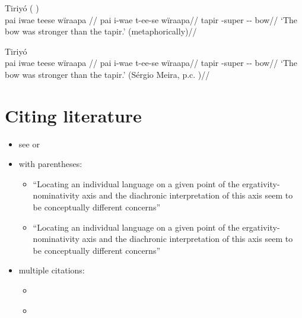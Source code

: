 \documentclass{memoir}
\begin{document}
\ex  Tiriyó (\cite[420]{triomeira1999}
) \\\label{tri-1}
\begingl \glpreamble pai iwae teese wïraapa //
\gla pai i-wae t-ee-se wïraapa//
\glb tapir -super -- bow//
\glft ‘The bow was stronger than the tapir.’ (metaphorically)//
\endgl
\xe

\ex  Tiriyó  \\\label{tri-1}
\begingl \glpreamble pai iwae teese wïraapa //
\gla pai i-wae t-ee-se wïraapa//
\glb tapir -super -- bow//
\glft ‘The bow was stronger than the tapir.’ (Sérgio Meira, p.c.
)//
\endgl
\xe

\chapter{\texorpdfstring{Citing literature
\label{sec:sources}}{Citing literature }}

\begin{itemize}
\tightlist
\item
  see \textcites{alvarez1998split} or
  \textcites[133-134]{alvarez1998split}
\item
  with parentheses:

  \begin{itemize}
  \tightlist
  \item
    ``Locating an individual language on a given point of the
    ergativity-nominativity axis and the diachronic interpretation of
    this axis seem to be conceptually different concerns''
    \parencites{alvarez1998split}
  \item
    ``Locating an individual language on a given point of the
    ergativity-nominativity axis and the diachronic interpretation of
    this axis seem to be conceptually different concerns''
    \parencites[71]{alvarez1998split}
  \end{itemize}
\item
  multiple citations:

  \begin{itemize}
  \tightlist
  \item
    \textcites[133-134]{alvarez1998split}[218]{triomeira1999}
  \item
    \parencites[133-134]{alvarez1998split}[218]{triomeira1999}
  \end{itemize}
\end{itemize}

\printbibliography
\end{document}

